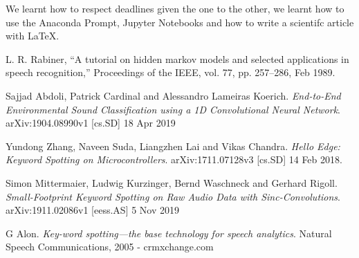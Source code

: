 \documentclass[conference]{IEEEtran}
\begin{document}
We learnt how to respect deadlines given the one to the other, we learnt how to use the Anaconda Prompt, Jupyter Notebooks and how to write a scientifc article with \LaTeX.

\begin{thebibliography}{1}
L. R. Rabiner, “A tutorial on hidden markov models and selected applications in speech recognition,” Proceedings of the IEEE, vol. 77, pp. 257–286, Feb 1989.

Sajjad Abdoli, Patrick Cardinal and Alessandro Lameiras Koerich. \textit{End-to-End Environmental Sound Classification using a 1D Convolutional Neural Network}. arXiv:1904.08990v1 [cs.SD] 18 Apr 2019

Yundong Zhang, Naveen Suda, Liangzhen Lai and Vikas Chandra. \textit{Hello Edge: Keyword Spotting on Microcontrollers}. arXiv:1711.07128v3 [cs.SD] 14 Feb 2018.

Simon Mittermaier, Ludwig Kurzinger, Bernd Waschneck and Gerhard Rigoll. \textit{Small-Footprint Keyword Spotting on Raw Audio Data with Sinc-Convolutions}. arXiv:1911.02086v1 [eess.AS] 5 Nov 2019

G Alon. \textit{Key-word spotting—the base technology for speech analytics}. Natural Speech Communications, 2005 - crmxchange.com
\end{thebibliography}
\end{document}
